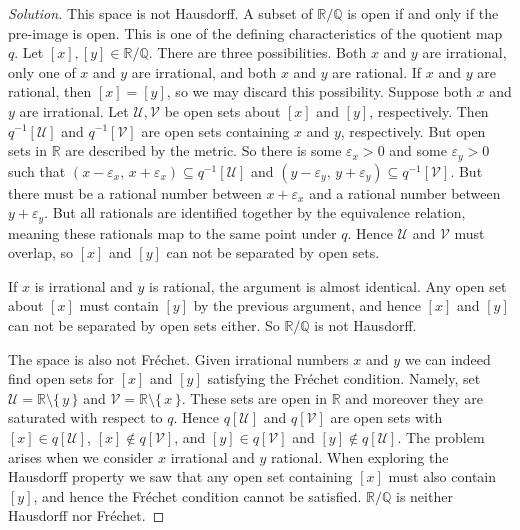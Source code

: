 \documentclass{article}
\theoremstyle{normal}
\begin{document}
    \begin{proof}[Solution]
        This space is not Hausdorff. A subset of $\mathbb{R}/\mathbb{Q}$ is
        open if and only if the pre-image is open. This is one of the
        defining characteristics of the quotient map $q$.
        Let $[x],[y]\in\mathbb{R}/\mathbb{Q}$. There are three possibilities.
        Both $x$ and $y$ are irrational, only one of $x$ and $y$ are irrational,
        and both $x$ and $y$ are rational. If $x$ and $y$ are rational, then
        $[x]=[y]$, so we may discard this possibility. Suppose both
        $x$ and $y$ are irrational. Let $\mathcal{U},\mathcal{V}$ be
        open sets about $[x]$ and $[y]$, respectively. Then
        $q^{-1}[\mathcal{U}]$ and $q^{-1}[\mathcal{V}]$ are open sets
        containing $x$ and $y$, respectively. But open sets in $\mathbb{R}$
        are described by the metric. So there is some $\varepsilon_{x}>0$ and
        some $\varepsilon_{y}>0$ such that
        $(x-\varepsilon_{x},\,x+\varepsilon_{x})\subseteq{q}^{-1}[\mathcal{U}]$
        and
        $(y-\varepsilon_{y},\,y+\varepsilon_{y})\subseteq{q}^{-1}[\mathcal{V}]$.
        But there must be a rational number between
        $x+\varepsilon_{x}$ and a rational number between $y+\varepsilon_{y}$.
        But all rationals are identified together by the equivalence relation,
        meaning these rationals map to the same point under $q$. Hence
        $\mathcal{U}$ and $\mathcal{V}$ must overlap, so $[x]$ and $[y]$ can not
        be separated by open sets.
        \par\hfill\par
        If $x$ is irrational and $y$ is rational, the argument is almost
        identical. Any open set about $[x]$ must contain $[y]$ by the previous
        argument, and hence $[x]$ and $[y]$ can not be separated by open sets
        either. So $\mathbb{R}/\mathbb{Q}$ is not Hausdorff.
        \par\hfill\par
        The space is also not Fr\'{e}chet. Given irrational numbers $x$ and
        $y$ we can indeed find open sets for $[x]$ and $[y]$ satisfying the
        Fr\'{e}chet condition. Namely, set
        $\mathcal{U}=\mathbb{R}\setminus\{\,y\,\}$ and
        $\mathcal{V}=\mathbb{R}\setminus\{\,x\,\}$. These sets are open in
        $\mathbb{R}$ and moreover they are saturated with respect to $q$.
        Hence $q[\mathcal{U}]$ and $q[\mathcal{V}]$ are open sets with
        $[x]\in{q}[\mathcal{U}]$, $[x]\notin{q}[\mathcal{V}]$, and
        $[y]\in{q}[\mathcal{V}]$ and $[y]\notin{q}[\mathcal{U}]$. The
        problem arises when we consider $x$ irrational and $y$ rational. When
        exploring the Hausdorff property we saw that any open set containing
        $[x]$ must also contain $[y]$, and hence the Fr\'{e}chet condition
        cannot be satisfied. $\mathbb{R}/\mathbb{Q}$ is neither Hausdorff nor
        Fr\'{e}chet.
    \end{proof}
\end{document}
